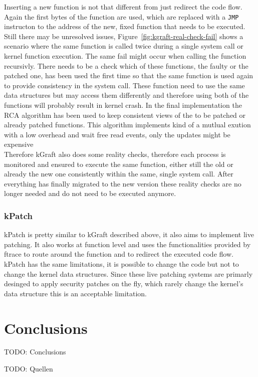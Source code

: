 \documentclass{sig-alternate-05-2015}
\begin{document}
Inserting a new function is not that different from just redirect the code flow. Again the first bytes of the function are used, which are replaced with a \texttt{JMP} instructon to the address of the new, fixed function that needs to be executed. \\ Still there may be unresolved issues, Figure~\ref{fig:kgraft-real-check-fail} shows a scenario where the same function is called twice during a single system call or kernel function execution. The same fail might occur when calling the function recursivly. There needs to be a check which of these functions, the faulty or the patched one, has been used the first time so that the same function is used again to provide consistency in the system call. These function need to use the same data structures but may access them differently and therefore using both of the functions will probably result in kernel crash. In the final implementation the RCA algorithm has been used to keep consistent views of the to be patched or already patched functions. This algorithm implements kind of a mutlual exution with a low overhead and wait free read events, only the updates might be expensive  \\
Therefore kGraft also does some reality checks, therefore each process is monitored and ensured to execute the same function, either still the old or already the new one consistently within the same, single system call. After everything has finally migrated to the new version these reality checks are no longer needed and do not need to be executed anymore. 

\subsubsection{kPatch}
kPatch is pretty similar to kGraft described above, it also aims to implement live patching. It also works at function level and uses the functionalities provided by ftrace to route around the function and to redirect the executed code flow. kPatch has the same limitations, it is possible to change the code but not to change the kernel data structures. Since these live patching systems are primarly desinged to apply security patches on the fly, which rarely change the kernel's data structure this is an acceptable limitation.



\section{Conclusions}

TODO: Conclusions

TODO: Quellen



\balancecolumns{}
\end{document}
